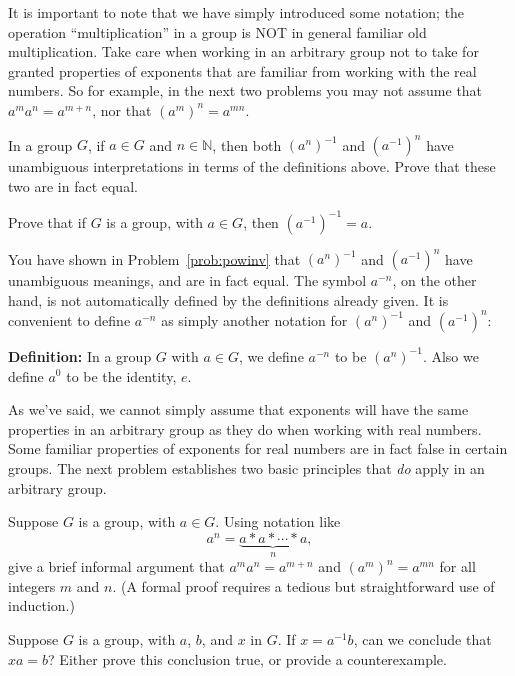 It is important to note that we have simply introduced some notation; the operation ``multiplication'' in a group is NOT in general familiar old multiplication. Take care when working in an arbitrary group not to take for granted properties of exponents that are familiar from working with the real numbers. So for example, in the next two problems you may not assume that \(a^ma^n = a^{m+n}\), nor that \((a^m)^n = a^{mn}\).

\begin{problem}\label{prob:powinv}
In a group \(G\), if \(a \in G\) and \(n \in \mathbb{N}\), then both \( (a^n)^{-1}\) and \((a^{-1})^n\) have unambiguous interpretations in terms of the definitions above. Prove that these two are in fact equal.
\end{problem}

\begin{problem}
Prove that if \(G\) is a group, with \(a \in G\), then \((a^{-1})^{-1} = a\).
\end{problem}

You have shown in Problem~\ref{prob:powinv} that \((a^n)^{-1}\) and \((a^{-1})^n\) have unambiguous meanings, and are in fact equal. The symbol \(a^{-n}\), on the other hand, is not automatically defined by the definitions already given. It is convenient to define \(a^{-n}\) as simply another notation for \((a^n)^{-1}\) and \((a^{-1})^n\):

\textbf{Definition:} In a group \(G\) with \(a \in G\), we define \(a^{-n}\) to be \((a^n)^{-1}\). Also we define \(a^0\) to be the identity, \(e\).

As we've said, we cannot simply assume that exponents will have the same properties in an arbitrary group as they do when working with real numbers. Some familiar properties of exponents for real numbers are in fact false in certain groups. The next problem establishes two basic principles that \emph{do} apply in an arbitrary group.

\begin{problem}
Suppose \(G\) is a group, with \(a \in G\). Using notation like \[a^n = \underbrace{a * a * \cdots * a}_n, \] give a brief informal argument  that \(a^ma^n = a^{m+n}\) and \((a^m)^n = a^{mn}\) for all integers \(m\) and \(n\). (A formal proof requires a tedious but straightforward use of induction.)
\end{problem}

\begin{problem}
Suppose \(G\) is a group, with \(a\), \(b\), and \(x\) in \(G\). If \(x=a^{-1}b\), can we conclude that \(xa = b\)? Either prove this conclusion true, or provide a counterexample.
\end{problem}

